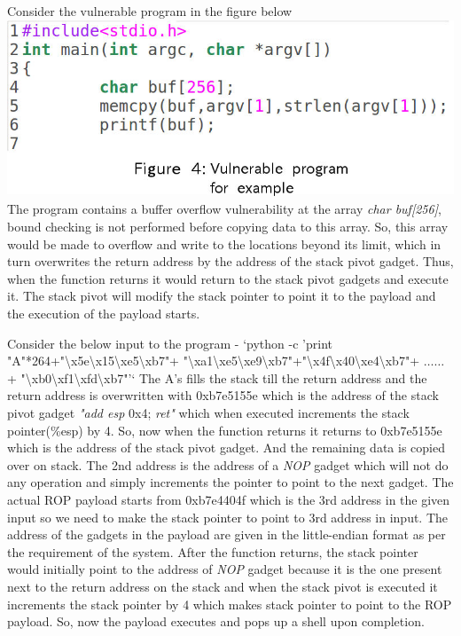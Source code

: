\documentclass{article}
\begin{document}
\begin{multicols}{2}
	Consider the vulnerable program in the figure below
	\break \break
	\includegraphics[scale=.27]{vul_prog.jpg}\break \break
	The program contains a buffer overflow vulnerability at the array \textit{char buf[256]}, bound checking is not performed before copying data to this array. So, this array would be made to overflow and write to the locations beyond its limit, which in turn overwrites the return address by the address of the stack pivot gadget. Thus, when the function returns it would return to the stack pivot gadgets and execute it. The stack pivot will modify the stack pointer to point it to the payload and the execution of the payload starts.
	
	Consider the below input to the program - \break
	`python -c 'print "A"*264+"\textbackslash x5e\textbackslash x15\textbackslash xe5\textbackslash xb7"+ "\textbackslash xa1\textbackslash xe5\textbackslash xe9\textbackslash xb7"+"\textbackslash x4f\textbackslash x40\textbackslash xe4\textbackslash xb7"+ $\ldots\ldots$ + "\textbackslash xb0\textbackslash xf1\textbackslash xfd\textbackslash xb7"'` \break
	The A's fills the stack till the return address and the return address is overwritten with 0xb7e5155e which is the address of the stack pivot gadget \textit{"add esp} 0x4;\textit{ ret"} which when executed increments the stack pointer(\%esp) by 4. So, now when the function returns it returns to 0xb7e5155e which is the address of the stack pivot gadget. And the remaining data is copied over on stack. The 2nd address is the address of a \textit{NOP} gadget which will not do any operation and simply increments the pointer to point to the next gadget. The actual ROP payload starts from 0xb7e4404f which is the 3rd address in the given input so we need to make the stack pointer to point to 3rd address in input. The address of the gadgets in the payload are given in the little-endian format as per the requirement of the system. After the function returns, the stack pointer would initially point to the address of \textit{NOP} gadget because it is the one present next to the return address on the stack and when the stack pivot is executed it increments the stack pointer by 4 which makes stack pointer to point to the ROP payload. So, now the payload executes and pops up a shell upon completion.
	

\end{multicols}
\end{document}
